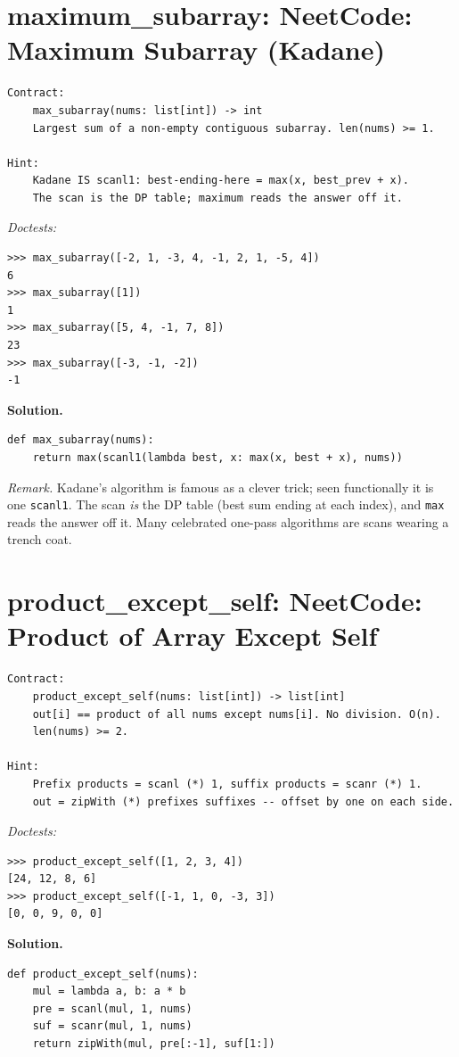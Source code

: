 \documentclass[11pt,letterpaper]{book}
\begin{document}
\section{maximum\_subarray: NeetCode: Maximum Subarray (Kadane)}
\begin{lstlisting}[style=spec]
Contract:
    max_subarray(nums: list[int]) -> int
    Largest sum of a non-empty contiguous subarray. len(nums) >= 1.

Hint:
    Kadane IS scanl1: best-ending-here = max(x, best_prev + x).
    The scan is the DP table; maximum reads the answer off it.
\end{lstlisting}
\noindent\textit{Doctests:}
\begin{lstlisting}[style=spec]
>>> max_subarray([-2, 1, -3, 4, -1, 2, 1, -5, 4])
6
>>> max_subarray([1])
1
>>> max_subarray([5, 4, -1, 7, 8])
23
>>> max_subarray([-3, -1, -2])
-1
\end{lstlisting}
\noindent\textbf{Solution.}
\begin{lstlisting}[style=code]
def max_subarray(nums):
    return max(scanl1(lambda best, x: max(x, best + x), nums))
\end{lstlisting}

\noindent\textit{Remark.} Kadane's algorithm is famous as a clever trick; seen
functionally it is one \texttt{scanl1}. The scan \emph{is} the DP table
(best sum ending at each index), and \texttt{max} reads the answer off it. Many
celebrated one-pass algorithms are scans wearing a trench coat.

\section{product\_except\_self: NeetCode: Product of Array Except Self}
\begin{lstlisting}[style=spec]
Contract:
    product_except_self(nums: list[int]) -> list[int]
    out[i] == product of all nums except nums[i]. No division. O(n).
    len(nums) >= 2.

Hint:
    Prefix products = scanl (*) 1, suffix products = scanr (*) 1.
    out = zipWith (*) prefixes suffixes -- offset by one on each side.
\end{lstlisting}
\noindent\textit{Doctests:}
\begin{lstlisting}[style=spec]
>>> product_except_self([1, 2, 3, 4])
[24, 12, 8, 6]
>>> product_except_self([-1, 1, 0, -3, 3])
[0, 0, 9, 0, 0]
\end{lstlisting}
\noindent\textbf{Solution.}
\begin{lstlisting}[style=code]
def product_except_self(nums):
    mul = lambda a, b: a * b
    pre = scanl(mul, 1, nums)
    suf = scanr(mul, 1, nums)
    return zipWith(mul, pre[:-1], suf[1:])
\end{lstlisting}
\end{document}
